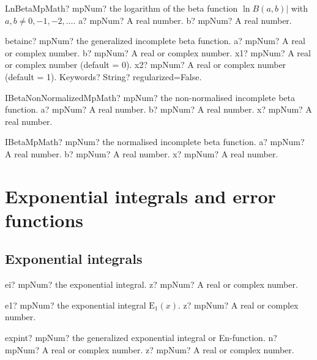 \documentclass[12pt,a4paper,openany]{book}
\begin{document}
\begin{mpFunctionsExtract}
\mpFunctionTwoNotImplemented
{LnBetaMpMath? mpNum? the logarithm of the beta function $\ln B(a,b)|$ with $a,b \neq 0,-1,-2,\ldots$.}
{a? mpNum? A real number.}
{b? mpNum? A real number.}
\end{mpFunctionsExtract}

\begin{mpFunctionsExtract}
\mpFunctionFive
{betainc? mpNum? the generalized incomplete beta function.}
{a? mpNum? A real or complex number.}
{b? mpNum? A real or complex number.}
{x1? mpNum? A real or complex number (default = 0).}
{x2? mpNum? A real or complex number (default = 1).}
{Keywords? String?  regularized=False.}
\end{mpFunctionsExtract}

\begin{mpFunctionsExtract}
\mpFunctionThreeNotImplemented
{IBetaNonNormalizedMpMath? mpNum? the non-normalised incomplete beta function.}
{a? mpNum? A real number.}
{b? mpNum? A real number.}
{x? mpNum? A real number.}
\end{mpFunctionsExtract}

\begin{mpFunctionsExtract}
\mpFunctionThreeNotImplemented
{IBetaMpMath? mpNum? the normalised incomplete beta function.}
{a? mpNum? A real number.}
{b? mpNum? A real number.}
{x? mpNum? A real number.}
\end{mpFunctionsExtract}

\chapter{Exponential integrals and error functions}

\section{Exponential integrals}

\begin{mpFunctionsExtract}
\mpFunctionOne
{ei? mpNum? the exponential integral.}
{z? mpNum? A real or complex number.}
\end{mpFunctionsExtract}

\begin{mpFunctionsExtract}
\mpFunctionOne
{e1? mpNum? the exponential integral $\text{E}_1(x)$.}
{z? mpNum? A real or complex number.}
\end{mpFunctionsExtract}

\begin{mpFunctionsExtract}
\mpFunctionTwo
{expint? mpNum? the generalized exponential integral or En-function.}
{n? mpNum? A real or complex number.}
{z? mpNum? A real or complex number.}
\end{mpFunctionsExtract}
\end{document}
